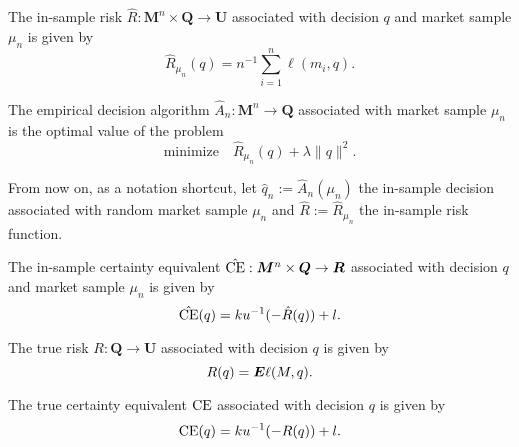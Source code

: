 \documentclass{article}
\begin{document}
\begin{deff}
  The in-sample risk $\hat R: \bm M^n\times \bm Q \to \bm U$ associated with decision $q$
  and market sample $\mu_n$ is given by
  \[
    \hat R_{\mu_n}(q) = n^{-1} \sum_{i=1}^n \ell(m_i,q).
  \]
\end{deff}

\begin{deff}
  The empirical decision algorithm $\hat A_n:\bm M^n \to \bm Q$ associated with
  market sample $\mu_n$ is the optimal value of the problem
  \[
    \text{minimize}\quad\hat R_{\mu_n}(q) + \lambda\|q\|^2.
  \]
\end{deff}

From now on, as a notation shortcut, let $\hat q_n := \hat A_n(\mu_n)$ the in-sample
decision associated with random market sample $\mu_n$ and $\hat R:=\hat R_{\mu_n}$ the
in-sample risk function.

\begin{deff}
  The in-sample certainty equivalent $\hat{\operatorname{CE}}:\bm M^n\times\bm Q\to\bm R$ associated with
  decision $q$ and market sample $\mu_n$ is given by
  \[
    \hat{\operatorname{CE}}(q) = ku^{-1}(-\hat R(q)) + l.
  \]
\end{deff}


\begin{deff}
  The true risk $R:\bm Q\to\bm U$ associated with decision $q$ is given by
  \[
    R(q) = \bm E\ell(M,q).
  \]
\end{deff}




\begin{deff}
  The true certainty equivalent $\operatorname{CE}$ associated with decision $q$ is given by
  \[
    \operatorname{CE}(q) = ku^{-1}(-R(q)) + l.
  \]
\end{deff}
\end{document}
